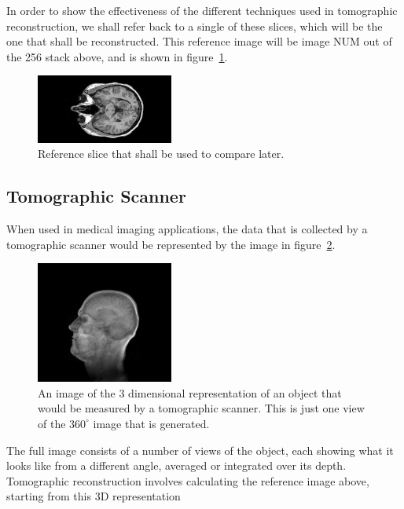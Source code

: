     In order to show the effectiveness of the different techniques used in tomographic reconstruction, we shall refer back to a single of these slices, which will be the one that shall be reconstructed. This reference image will be image NUM out of the 256 stack above, and is shown in figure~\ref{fig:reference_slice}.
    \begin{figure}[ht]
        \centering
        \includegraphics[width=0.4\textwidth]{Files/report_images/reference_slice.jpg}
        \caption{Reference slice that shall be used to compare later.\label{fig:reference_slice}} 
    \end{figure}
    
    \subsection{Tomographic Scanner} %
    \label{sub:tomographic_scanner}
        When used in medical imaging applications, the data that is collected by a tomographic scanner would be represented by the image in figure~\ref{fig:3d_scan_example}.
        \begin{figure}[ht]
            \centering
                \includegraphics[width=0.4\textwidth]{Files/report_images/3D_scan_example.jpg}
            \caption{An image of the 3 dimensional representation of an object that would be measured by a tomographic scanner. This is just one view of the $360^{\circ}$ image that is generated.\label{fig:3d_scan_example}}
        \end{figure}

        The full image consists of a number of views of the object, each showing what it looks like from a different angle, averaged or integrated over its depth. Tomographic reconstruction involves calculating the reference image above, starting from this 3D representation

